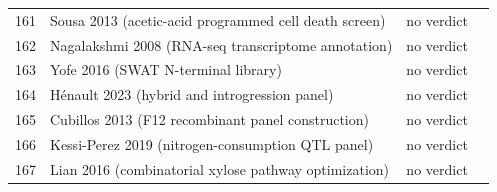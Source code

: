 \begin{longtable}{@{}r L{88mm} L{40mm} L{24mm}@{}}
161 & Sousa 2013 (acetic-acid programmed cell death screen) & no verdict &  \\
162 & Nagalakshmi 2008 (RNA-seq transcriptome annotation) & no verdict &  \\
163 & Yofe 2016 (SWAT N-terminal library) & no verdict &  \\
164 & Hénault 2023 (hybrid and introgression panel) & no verdict &  \\
165 & Cubillos 2013 (F12 recombinant panel construction) & no verdict &  \\
166 & Kessi-Perez 2019 (nitrogen-consumption QTL panel) & no verdict &  \\
167 & Lian 2016 (combinatorial xylose pathway optimization) & no verdict &  \\
\end{longtable}
\endgroup
